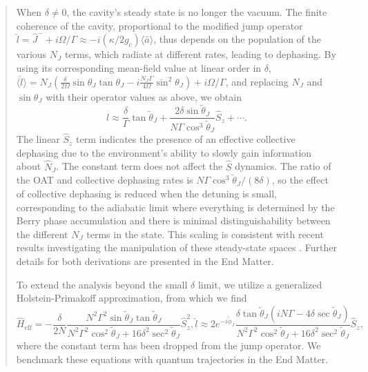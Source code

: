 \begin{abstract}
When $\delta \neq 0$, the cavity's steady state is no longer the vacuum. The finite  coherence of the cavity,  proportional to the modified jump operator $\hat l = \hat J^- + i \Omega/\Gamma \approx -i (\kappa/2 g_c) \langle \hat a \rangle$, thus   depends on  the population of the  various $N_J$ terms, which radiate at different rates,   leading to dephasing. 
By using its  corresponding  mean-field value at linear order in $\delta$, $ \langle \hat l \rangle = N_J \left(\frac{\delta}{2 \Omega} \sin \theta_J\tan \theta_J - i \frac{N_J \Gamma}{4 \Omega} \sin^2 \theta_J \right) + i \Omega/\Gamma $, and  replacing  $N_J$ and $\sin\theta_J$ with their operator values as above, we obtain  
\begin{equation}
\label{eq:l}
    \hat l\approx \frac{\delta}{\Gamma} \tan \tilde{\theta}_J + \frac{2 \delta  \sin \tilde{\theta}_J}{N \Gamma \cos^3 \tilde{\theta}_J } \hat S_z + \cdots .
\end{equation} 
The linear $\hat S_z$ term indicates the presence of an effective collective dephasing due to the environment's ability to slowly gain information about $\hat N_J$. The constant term does not affect the $\hat S$ dynamics. The ratio of the OAT and collective dephasing rates is $N \Gamma \cos^3 \tilde{\theta}_J/(8 \delta)$, so the effect of collective dephasing is reduced when the detuning is small, corresponding to the adiabatic limit where everything is determined by the Berry phase accumulation and there is minimal distinguishability between the different $N_J$ terms in the state. This scaling is consistent with recent results investigating the manipulation of these steady-state spaces \cite{Santos2024}. Further details for both derivations are presented in the End Matter.

To extend the analysis beyond the small $\delta$ limit, we utilize a generalized Holstein-Primakoff approximation, from which we find \cite{suppcite}
\begin{subequations}
\label{eq:AEHP}
    \begin{equation}
        \hat H_{\text{eff}} =  -\frac{\delta}{2N } \frac{N^2 \Gamma^2 \sin \tilde{\theta}_J \tan \tilde{\theta}_J}{N^2 \Gamma^2 \cos^2 \tilde{\theta}_J + 16 \delta^2 \sec^2 \tilde{\theta}_J} \hat S_z^2,
    \end{equation}
    \begin{equation}
        \hat l \approx 2  e^{-i \tilde{\phi}_J} \frac{\delta \tan \tilde{\theta}_J (i N \Gamma - 4 \delta \sec \tilde{\theta}_J ) }{N^2 \Gamma^2 \cos^2 \tilde{\theta}_J + 16 \delta^2 \sec^2 \tilde{\theta}_J} \hat S_z,
    \end{equation}
\end{subequations}
where the constant term has been dropped from the jump operator. We benchmark these equations with quantum trajectories in the End Matter.


\end{abstract}
